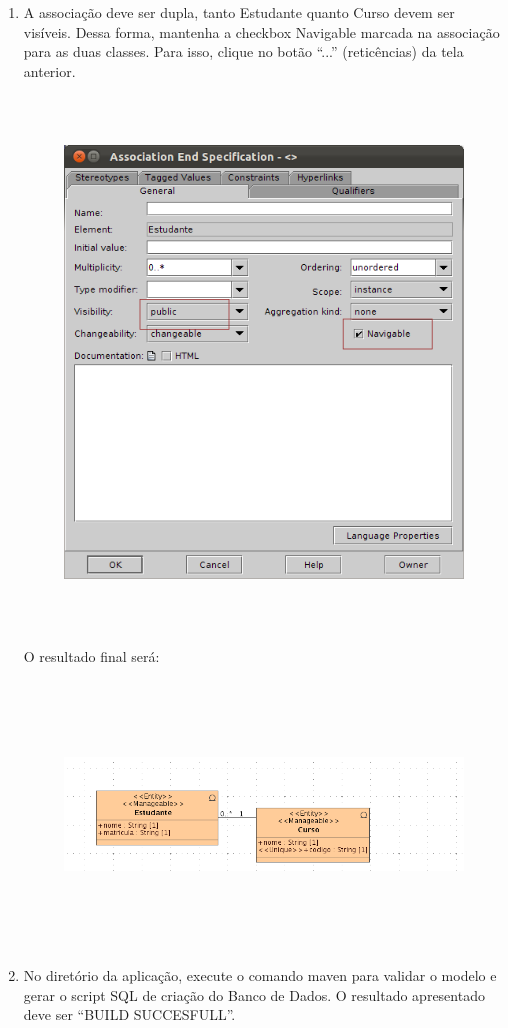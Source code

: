 \begin{enumerate}
	\item A associação deve ser dupla, tanto Estudante quanto Curso devem ser
	visíveis. Dessa forma, mantenha a checkbox Navigable marcada na associação para
	as duas classes. Para isso, clique no botão “...” (reticências) da tela
	anterior.
		\begin{figure}[!htb]
			\centering
			\includegraphics[width=350pt,height=400pt]{imgs/tutorial-mdarte-0006.png}
		\end{figure}
		
	O resultado final será:
		\begin{figure}[!htb]
			\centering
			\includegraphics[width=500pt,height=200pt]{imgs/tutorial-mdarte-0007.png}
		\end{figure}
	
	\item No diretório da aplicação, execute o comando maven para validar o modelo
	e gerar o script SQL de criação do Banco de Dados. O resultado apresentado deve
	ser “BUILD SUCCESFULL”.

\end{enumerate}